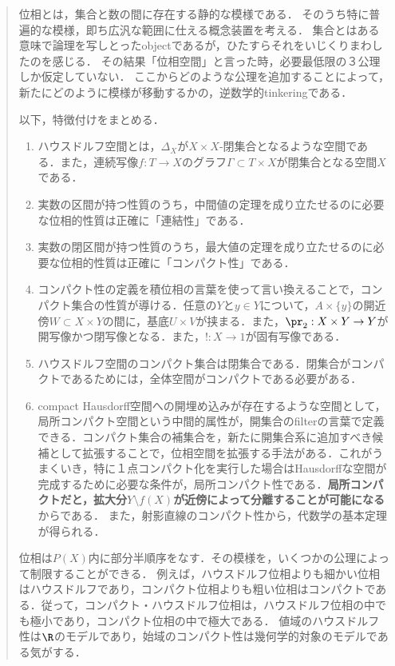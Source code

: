 \documentclass[uplatex,dvipdfmx]{jsreport}
\begin{document}
\begin{quotation}
    位相とは，集合と数の間に存在する静的な模様である．
    そのうち特に普遍的な模様，即ち広汎な範囲に仕える概念装置を考える．
    集合とはある意味で論理を写しとったobjectであるが，ひたすらそれをいじくりまわしたのを感じる．
    その結果「位相空間」と言った時，必要最低限の３公理しか仮定していない．
    ここからどのような公理を追加することによって，新たにどのように模様が移動するかの，逆数学的tinkeringである．
    
    以下，特徴付けをまとめる．
    \begin{enumerate}
        \item ハウスドルフ空間とは，$\Delta_X$が$X\times X$-閉集合となるような空間である．また，連続写像$f:T\to X$のグラフ$\Gamma\subset T\times X$が閉集合となる空間$X$である．
        \item 実数の区間が持つ性質のうち，中間値の定理を成り立たせるのに必要な位相的性質は正確に「連結性」である．
        \item 実数の閉区間が持つ性質のうち，最大値の定理を成り立たせるのに必要な位相的性質は正確に「コンパクト性」である．
        \item コンパクト性の定義を積位相の言葉を使って言い換えることで，コンパクト集合の性質が導ける．任意の$Y$と$y\in Y$について，$A\times\{y\}$の開近傍$W\subset X\times Y$の間に，基底$U\times V$が挟まる．また，$\pr_2:X\times Y\to Y$が開写像かつ閉写像となる．また，$!:X\to 1$が固有写像である．
        \item ハウスドルフ空間のコンパクト集合は閉集合である．閉集合がコンパクトであるためには，全体空間がコンパクトである必要がある．
        \item compact Hausdorff空間への開埋め込みが存在するような空間として，局所コンパクト空間という中間的属性が，開集合のfilterの言葉で定義できる．コンパクト集合の補集合を，新たに開集合系に追加すべき候補として拡張することで，位相空間を拡張する手法がある．これがうまくいき，特に１点コンパクト化を実行した場合はHausdorffな空間が完成するために必要な条件が，局所コンパクト性である．\textbf{局所コンパクトだと，拡大分$Y\setminus f(X)$が近傍によって分離することが可能になる}からである．
        また，射影直線のコンパクト性から，代数学の基本定理が得られる．
    \end{enumerate}
    位相は$P(X)$内に部分半順序をなす．その模様を，いくつかの公理によって制限することができる．
    例えば，ハウスドルフ位相よりも細かい位相はハウスドルフであり，コンパクト位相よりも粗い位相はコンパクトである．従って，コンパクト・ハウスドルフ位相は，ハウスドルフ位相の中でも極小であり，コンパクト位相の中で極大である．
    値域のハウスドルフ性は$\R$のモデルであり，始域のコンパクト性は幾何学的対象のモデルである気がする．


\end{quotation}
\end{document}
